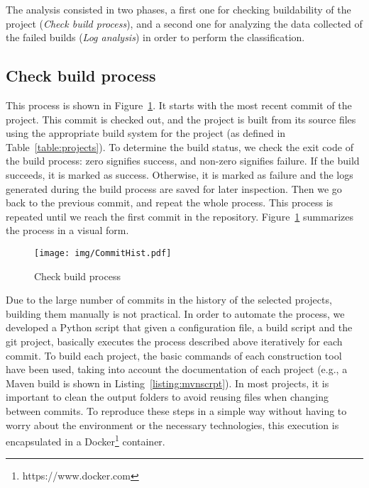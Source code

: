 The analysis consisted in two phases, a first one for checking buildability of the project (\textit{Check build process}), and a second one for analyzing the data collected of the failed builds (\textit{Log analysis}) in order to perform the classification.


\subsection{Check build process}

This process is shown in Figure~\ref{fig:commitHist}.
It starts with the most recent commit of the project.
This commit is checked out, and the project is built from its source files using the appropriate build system for the project (as defined in Table~\ref{table:projects}).
To determine the build status, we check the exit code of the build process: zero signifies success, and non-zero signifies failure.
If the build succeeds, it is marked as success.
Otherwise, it is marked as failure and the logs generated during the build process are saved for later inspection.
Then we go back to the previous commit, and repeat the whole process.
This process is repeated until we reach the first commit in the repository.
Figure~\ref{fig:commitHist} summarizes the process in a visual form.

\begin{figure}[h]
	\centering    
	\texttt{[image: img/CommitHist.pdf]}
	\caption{Check build process}
	\label{fig:commitHist}
\end{figure}

Due to the large number of commits in the history of the selected projects, building them manually is not practical.
In order to automate the process, we developed a Python script that given a configuration file, a build script and the git project, basically executes the process described above iteratively for each commit.
To build each project, the basic commands of each construction tool have been used, taking into account the documentation of each project (e.g., a Maven build is shown in Listing~\ref{listing:mvnscrpt}).
In most projects, it is important to clean the output folders to avoid reusing files when changing between commits.
To reproduce these steps in a simple way without having to worry about the environment or the necessary technologies, this execution is encapsulated in a Docker\footnote{https://www.docker.com} container.

